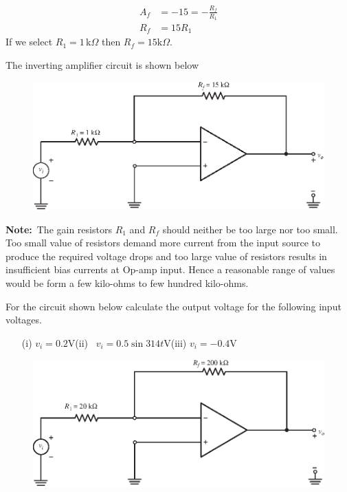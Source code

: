 \begin{solution}
\begin{align*}
A_{f} &= -15=-\frac{R_{f}}{R_{1}}\\[3pt]
R_{f} &= 15R_{1}
\end{align*}
If we select $R_{1}=1$\,k$\Omega$ then $R_{f}=15\text{k}\Omega$.

The inverting amplifier circuit is shown below
\begin{figure}[H]
\centering
\includegraphics[scale=.95]{chap4/S3-EE-06-IN002.eps}
\end{figure}

\noindent
{\bf Note:}~The gain resistors $R_{1}$ and $R_{f}$ should neither be too large nor too small. Too small value of resistors demand more current from the input source to produce the required voltage drops and too large value of resistors results in insufficient bias currents at Op-amp input. Hence a reasonable range of values would be form a few kilo-ohms to few hundred kilo-ohms.
\end{solution}

\begin{example}\label{exam5.8}
For the circuit shown below calculate the output voltage for the following input voltages.
\begin{itemize}
\item[(i)] $v_{i}=0.2$V\qquad (ii)~ $v_{i}=0.5\sin 314t$V\qquad (iii) $v_{i}=-0.4$V
\end{itemize}
\begin{figure}[H]
\centering
\includegraphics[scale=.95]{chap4/S3-EE-06-IN003.eps}
\end{figure}
\end{example}

